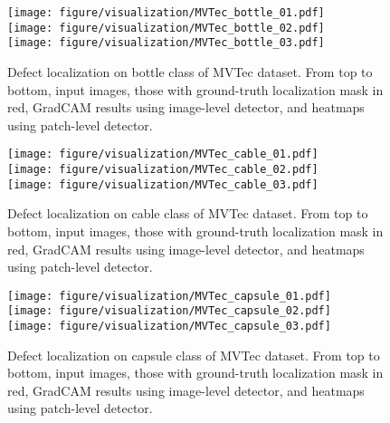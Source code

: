 \documentclass[final]{cvpr}
\begin{document}
\begin{figure}
    \centering
    \texttt{[image: figure/visualization/MVTec\_bottle\_01.pdf]}\\
    \vspace{0.05in}
    \texttt{[image: figure/visualization/MVTec\_bottle\_02.pdf]}\\
    \vspace{0.05in}
    \texttt{[image: figure/visualization/MVTec\_bottle\_03.pdf]}
    \caption{Defect localization on bottle class of MVTec dataset. From top to bottom, input images, those with ground-truth localization mask in red, GradCAM results using image-level detector, and heatmaps using patch-level detector.}
    \label{fig:heatmap_bottle}
\end{figure}

\begin{figure}
    \centering
    \texttt{[image: figure/visualization/MVTec\_cable\_01.pdf]}\\
    \vspace{0.05in}
    \texttt{[image: figure/visualization/MVTec\_cable\_02.pdf]}\\
    \vspace{0.05in}
    \texttt{[image: figure/visualization/MVTec\_cable\_03.pdf]}
    \caption{Defect localization on cable class of MVTec dataset. From top to bottom, input images, those with ground-truth localization mask in red, GradCAM results using image-level detector, and heatmaps using patch-level detector.}
    \label{fig:heatmap_cable}
\end{figure}

\begin{figure}
    \centering
    \texttt{[image: figure/visualization/MVTec\_capsule\_01.pdf]}\\
    \vspace{0.05in}
    \texttt{[image: figure/visualization/MVTec\_capsule\_02.pdf]}\\
    \vspace{0.05in}
    \texttt{[image: figure/visualization/MVTec\_capsule\_03.pdf]}
    \caption{Defect localization on capsule class of MVTec dataset. From top to bottom, input images, those with ground-truth localization mask in red, GradCAM results using image-level detector, and heatmaps using patch-level detector.}
    \label{fig:heatmap_capsule}
\end{figure}
\end{document}
